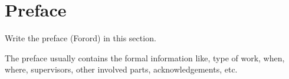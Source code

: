\chapter{Preface}
Write the preface (Forord) in this section. 

The preface usually contains the formal information like, type of work, when, where, supervisors, other involved parts, acknowledgements, etc.
